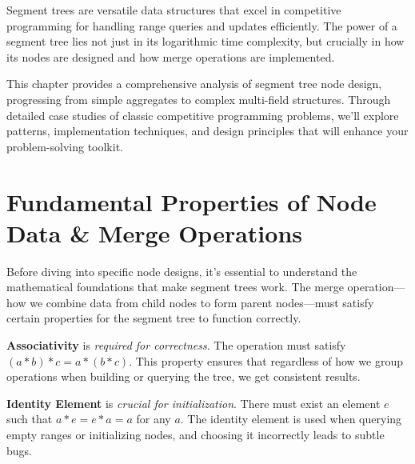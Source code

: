 \label{ch:node-design}
\label{chap:segment_tree_node_design}

Segment trees are versatile data structures that excel in competitive programming for handling range queries and updates efficiently. The power of a segment tree lies not just in its logarithmic time complexity, but crucially in how its nodes are designed and how merge operations are implemented.

This chapter provides a comprehensive analysis of segment tree node design, progressing from simple aggregates to complex multi-field structures. Through detailed case studies of classic competitive programming problems, we'll explore patterns, implementation techniques, and design principles that will enhance your problem-solving toolkit.

\section{Fundamental Properties of Node Data \& Merge Operations}

Before diving into specific node designs, it's essential to understand the mathematical foundations that make segment trees work. The merge operation—how we combine data from child nodes to form parent nodes—must satisfy certain properties for the segment tree to function correctly.


\textbf{Associativity} is \emph{required for correctness}. The operation must satisfy $(a \ast b) \ast c = a \ast (b \ast c)$. This property ensures that regardless of how we group operations when building or querying the tree, we get consistent results.

\textbf{Identity Element} is \emph{crucial for initialization}. There must exist an element $e$ such that $a \ast e = e \ast a = a$ for any $a$. The identity element is used when querying empty ranges or initializing nodes, and choosing it incorrectly leads to subtle bugs.


